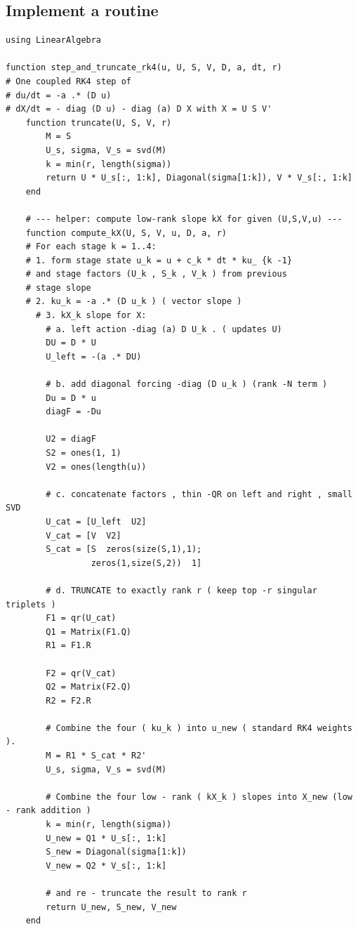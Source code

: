 \documentclass[11pt]{report}
\begin{document}
\subsection{Implement a routine}

\begin{lstlisting}
using LinearAlgebra

function step_and_truncate_rk4(u, U, S, V, D, a, dt, r)
# One coupled RK4 step of
# du/dt = -a .* (D u)
# dX/dt = - diag (D u) - diag (a) D X with X = U S V'
    function truncate(U, S, V, r)
        M = S
        U_s, sigma, V_s = svd(M)
        k = min(r, length(sigma))
        return U * U_s[:, 1:k], Diagonal(sigma[1:k]), V * V_s[:, 1:k]
    end

    # --- helper: compute low-rank slope kX for given (U,S,V,u) ---
    function compute_kX(U, S, V, u, D, a, r)
    # For each stage k = 1..4:
    # 1. form stage state u_k = u + c_k * dt * ku_ {k -1}
    # and stage factors (U_k , S_k , V_k ) from previous
    # stage slope
    # 2. ku_k = -a .* (D u_k ) ( vector slope )
      # 3. kX_k slope for X:
        # a. left action -diag (a) D U_k . ( updates U)
        DU = D * U
        U_left = -(a .* DU)        

        # b. add diagonal forcing -diag (D u_k ) (rank -N term )
        Du = D * u                  
        diagF = -Du                 

        U2 = diagF                   
        S2 = ones(1, 1)         
        V2 = ones(length(u))      

        # c. concatenate factors , thin -QR on left and right , small SVD
        U_cat = [U_left  U2]         
        V_cat = [V  V2]              
        S_cat = [S  zeros(size(S,1),1);
                 zeros(1,size(S,2))  1]

        # d. TRUNCATE to exactly rank r ( keep top -r singular triplets )
        F1 = qr(U_cat)
        Q1 = Matrix(F1.Q)
        R1 = F1.R

        F2 = qr(V_cat)
        Q2 = Matrix(F2.Q)
        R2 = F2.R 

        # Combine the four ( ku_k ) into u_new ( standard RK4 weights ).
        M = R1 * S_cat * R2'
        U_s, sigma, V_s = svd(M)

        # Combine the four low - rank ( kX_k ) slopes into X_new (low - rank addition )
        k = min(r, length(sigma))
        U_new = Q1 * U_s[:, 1:k]
        S_new = Diagonal(sigma[1:k])
        V_new = Q2 * V_s[:, 1:k]

        # and re - truncate the result to rank r
        return U_new, S_new, V_new
    end


\end{lstlisting}
\end{document}
